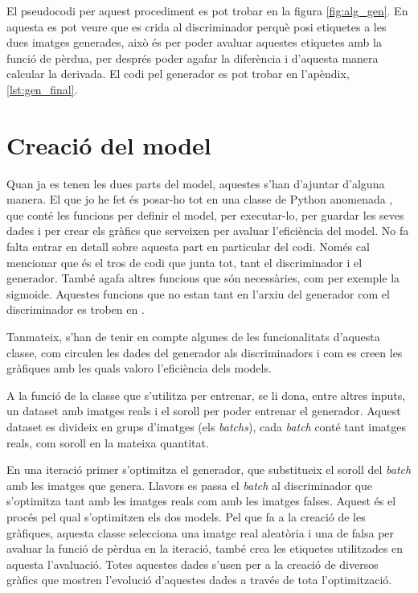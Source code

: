 El pseudocodi per aquest procediment es pot trobar en la figura \ref{fig:alg_gen}. En aquesta es pot veure que es crida al discriminador perquè posi etiquetes a les dues imatges generades, això és per poder avaluar aquestes etiquetes amb la funció de pèrdua, per després poder agafar la diferència i d'aquesta manera calcular la derivada. El codi pel generador es pot trobar en l'apèndix, \ref{lst:gen_final}.

\section{Creació del model}

Quan ja es tenen les dues parts del model, aquestes s'han d'ajuntar d'alguna manera. El que jo he fet és posar-ho tot en una classe de Python anomenada , que conté les funcions per definir el model, per executar-lo, per guardar les seves dades i per crear els gràfics que serveixen per avaluar l'eficiència del model. No fa falta entrar en detall sobre aquesta part en particular del codi. Només cal mencionar que és el tros de codi que junta tot, tant el discriminador i el generador. També agafa altres funcions que són necessàries, com per exemple la sigmoide. Aquestes funcions que no estan tant en l'arxiu del generador com el discriminador es troben en .

Tanmateix, s'han de tenir en compte algunes de les funcionalitats d'aquesta classe, com circulen les dades del generador als discriminadors i com es creen les gràfiques amb les quals valoro l'eficiència dels models.

A la funció de la classe  que s'utilitza per entrenar,  se li dona, entre altres inputs, un dataset amb imatges reals i el soroll per poder entrenar el generador. Aquest dataset es divideix en grups d'imatges (els \textit{batchs}), cada \textit{batch} conté tant imatges reals, com soroll en la mateixa quantitat.

En una iteració primer s'optimitza el generador, que substitueix el soroll del \textit{batch} amb les imatges que genera. Llavors es passa el \textit{batch} al discriminador que s'optimitza tant amb les imatges reals com amb les imatges falses. Aquest és el procés pel qual s'optimitzen els dos models. Pel que fa a la creació de les gràfiques, aquesta classe selecciona una imatge real aleatòria i una de falsa per avaluar la funció de pèrdua en la iteració, també crea les etiquetes utilitzades en aquesta l'avaluació. Totes aquestes dades s'usen per a la creació de diversos gràfics que mostren l'evolució d'aquestes dades a través de tota l'optimització.

